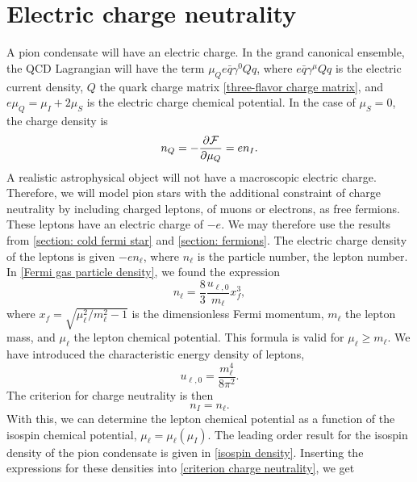 \section{Electric charge neutrality}
\label{section: charge neturality}


A pion condensate will have an electric charge.
In the grand canonical ensemble, the QCD Lagrangian will have the term  $\mu_Q e\bar q \gamma^0 Q q$, where $e \bar q \gamma^\mu Q q$ is the electric current density, $Q$ the quark charge matrix \autoref{three-flavor charge matrix}, and $e \mu_Q = \mu_I + 2 \mu_S$ is the electric charge chemical potential.
In the case of $\mu_S = 0$, the charge density is
%
\begin{equation}
    n_Q = - \pdv{\mathcal{F}}{\mu_Q} = e n_I.
\end{equation}
%
A realistic astrophysical object will not have a macroscopic electric charge.
Therefore, we will model pion stars with the additional constraint of charge neutrality by including charged leptons, of muons or electrons, as free fermions.
These leptons have an electric charge of $- e$.
We may therefore use the results from \autoref{section: cold fermi star} and \autoref{section: fermions}.
The electric charge density of the leptons is given $- e n_\ell$, where $n_\ell$ is the particle number, the lepton number.
In \autoref{Fermi gas particle density}, we found the expression
%
\begin{equation}
    \label{lepton density}
    n_{\ell} = \frac{8}{3} 
    \frac{u_{\ell, 0}}{m_\ell} x_f^3,
\end{equation}
%
where $x_f = \sqrt{ {\mu_\ell^2}/{m_\ell^2} - 1}$ is the dimensionless Fermi momentum, $m_\ell$ the lepton mass, and $\mu_\ell$ the lepton chemical potential.
This formula is valid for $\mu_\ell \geq m_\ell$.
We have introduced the characteristic energy density of leptons,
%
\begin{equation}
    u_{\ell, 0} = \frac{m^4_\ell}{8 \pi^2}.
\end{equation}
%
The criterion for charge neutrality is then
%
\begin{equation}
    \label{criterion charge neutrality}
    n_I = n_\ell.
\end{equation}
%
With this, we can determine the lepton chemical potential as a function of the isospin chemical potential, $\mu_\ell = \mu_\ell(\mu_I)$.
The leading order result for the isospin density of the pion condensate is given in \autoref{isospin density}.
Inserting the expressions for these densities into \autoref{criterion charge neutrality}, we get
